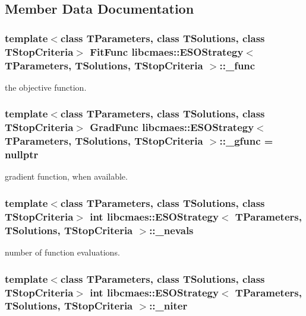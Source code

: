 \subsection{Member Data Documentation}
\hypertarget{classlibcmaes_1_1ESOStrategy_a1a29d4c30bbdb6021920275e81fa4dc4}{
\subsubsection[{\-\_\-func}]{\setlength{\rightskip}{0pt plus 5cm}template$<$class T\-Parameters, class T\-Solutions, class T\-Stop\-Criteria$>$ Fit\-Func {\bf libcmaes\-::\-E\-S\-O\-Strategy}$<$ T\-Parameters, T\-Solutions, T\-Stop\-Criteria $>$\-::\-\_\-func}}\label{classlibcmaes_1_1ESOStrategy_a1a29d4c30bbdb6021920275e81fa4dc4}
the objective function. \hypertarget{classlibcmaes_1_1ESOStrategy_a76926e49a2ca941a22362167bc230093}{
\subsubsection[{\-\_\-gfunc}]{\setlength{\rightskip}{0pt plus 5cm}template$<$class T\-Parameters, class T\-Solutions, class T\-Stop\-Criteria$>$ Grad\-Func {\bf libcmaes\-::\-E\-S\-O\-Strategy}$<$ T\-Parameters, T\-Solutions, T\-Stop\-Criteria $>$\-::\-\_\-gfunc = nullptr}}\label{classlibcmaes_1_1ESOStrategy_a76926e49a2ca941a22362167bc230093}
gradient function, when available. \hypertarget{classlibcmaes_1_1ESOStrategy_a19667f1e69856e7cfd6219b63cbaa59d}{
\subsubsection[{\-\_\-nevals}]{\setlength{\rightskip}{0pt plus 5cm}template$<$class T\-Parameters, class T\-Solutions, class T\-Stop\-Criteria$>$ int {\bf libcmaes\-::\-E\-S\-O\-Strategy}$<$ T\-Parameters, T\-Solutions, T\-Stop\-Criteria $>$\-::\-\_\-nevals}}\label{classlibcmaes_1_1ESOStrategy_a19667f1e69856e7cfd6219b63cbaa59d}
number of function evaluations. \hypertarget{classlibcmaes_1_1ESOStrategy_aaf5c063558da34826ea1f976423ccfbb}{
\subsubsection[{\-\_\-niter}]{\setlength{\rightskip}{0pt plus 5cm}template$<$class T\-Parameters, class T\-Solutions, class T\-Stop\-Criteria$>$ int {\bf libcmaes\-::\-E\-S\-O\-Strategy}$<$ T\-Parameters, T\-Solutions, T\-Stop\-Criteria $>$\-::\-\_\-niter}}\label{classlibcmaes_1_1ESOStrategy_aaf5c063558da34826ea1f976423ccfbb}
